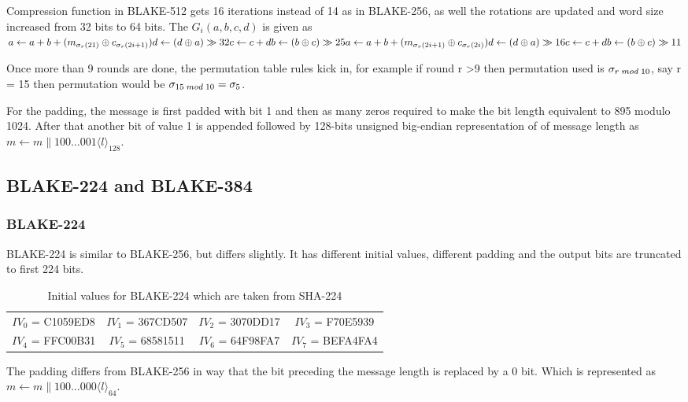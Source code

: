   Compression function in BLAKE-512 gets 16 iterations instead of 14 as in BLAKE-256, as well the rotations
  are updated and word size increased from 32 bits to 64 bits. The $G_{i}(a, b, c, d)$ 
  is given as
  $
  a \gets a + b + (m_{\sigma_{r}(21)} \oplus c_{\sigma_{r}(2i + 1)}) \\
  d \gets (d \oplus a) \gg 32 \\
  c \gets c + d \\
  b \gets (b \oplus c) \gg 25 \\
  a \gets a + b + (m_{\sigma_{r}(2i + 1)} \oplus c_{\sigma_{r}(2i)}) \\
  d \gets (d \oplus a) \gg 16 \\
  c \gets c + d \\
  b \gets (b \oplus c) \gg 11
  $
  
  Once more than 9 rounds are done, the permutation table rules kick in, for example if round r \textgreater 9 then
  permutation used is $\sigma_{r \thickspace mod \thickspace 10}$, say r = 15 then permutation would be 
  $\sigma_{15 \thickspace mod \thickspace 10} = \sigma_{5}$.

  For the padding, the message is first padded with bit 1 and then as many zeros required to make the bit length
  equivalent to 895 modulo 1024. After that another bit of value 1 is appended followed by 128-bits unsigned big-endian
  representation of of message length as $m \gets m \parallel 100 \dots 001 \langle l \rangle_{128}$.

\subsection{BLAKE-224 and BLAKE-384}

  \subsubsection{BLAKE-224}
  BLAKE-224 is similar to BLAKE-256, but differs slightly. It has different initial values, different padding and the
  output bits are truncated to first 224 bits.
  \begin{table}[h]
    \begin{center}
      \begin{tabular}{ *{4}{c}}
        $IV_{0}$ = C1059ED8 & $IV_{1}$ = 367CD507 & $IV_{2}$ = 3070DD17 & $IV_{3}$ = F70E5939 \\
        $IV_{4}$ = FFC00B31 & $IV_{5}$ = 68581511 & $IV_{6}$ = 64F98FA7 & $IV_{7}$ = BEFA4FA4 \\
      \end{tabular}
      \caption{Initial values for BLAKE-224 which are taken from SHA-224}
    \end{center}
  \end{table}
  The padding differs from BLAKE-256 in way that the bit preceding the message length is replaced by a 0 bit. Which
  is represented as $m \gets m \parallel 100 \dots 000 \langle l \rangle_{64}$.

